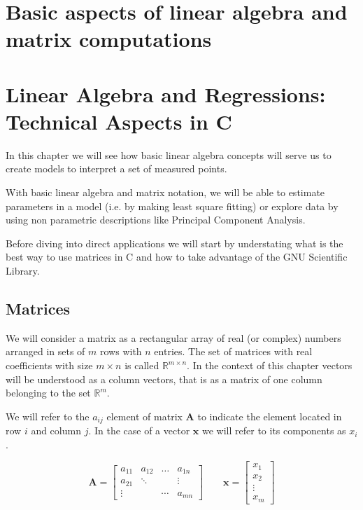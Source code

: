 \documentclass{article}
\newcommand{\real}{\mathbb{R}}
\begin{document}
\setcounter{section}{4}
\section{Basic aspects of linear algebra and matrix computations}


\section{Linear Algebra and Regressions: Technical Aspects in C}
In this chapter we will see how basic linear algebra concepts will
serve us to create models to interpret a set of measured points. 

With basic linear algebra and matrix notation, we will be able to
estimate parameters in a model (i.e. by making least square fitting)
or explore data by using non parametric descriptions like Principal
Component Analysis. 

Before diving into direct applications we will start by 
understating what is the best way to use matrices in C and how to take
advantage of the GNU Scientific Library. 


\subsection{Matrices}
We will consider a matrix as a rectangular array of real (or complex)
numbers arranged in sets of $m$ rows with $n$ entries. The set of
matrices with real coefficients with size $m\times n$ is called
$\real^{m\times n}$. In the context of this chapter vectors will be
understood as a column vectors, that is as a matrix of one column
belonging to the set $\real^{m}$.  

We will refer to the $a_{ij}$ element of matrix ${\mathbf A}$ to
indicate the element located in row $i$ and column $j$. In the case of
a vector ${\mathbf x}$ we will refer to its components as $x_{i}$. 


\begin{displaymath}
\mathbf{A} = 
\left[
\begin{array}{cccc}
a_{11}  & a_{12}  & \dots & a_{1n}   \\
a_{21}  &  \ddots &  & \vdots  \\
\vdots  &  & \cdots & a_{mn}   
\end{array}
\right]
\qquad
\mathbf{x} = 
\left[
\begin{array}{c}
x_{1}     \\
x_2          \\
\vdots     \\
x_{m}   
\end{array}
\right]
\end{displaymath}
\end{document}
